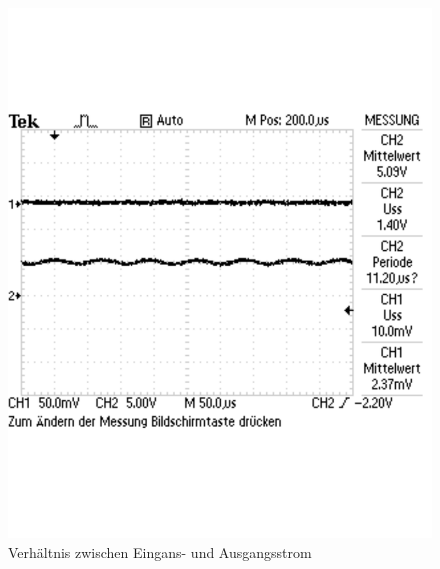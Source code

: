 \documentclass[12pt,a4paper]{article}
\begin{document}
\begin{figure}[H] 
  \centering
    \includegraphics[scale = 0.7]{a_3c.pdf}
  	\caption[Verhältnis zwischen Eingans- und Ausgangsstrom]{Verhältnis zwischen Eingans- und Ausgangsstrom}
  \label{fig:a_3c}
\end{figure}
\end{document}
